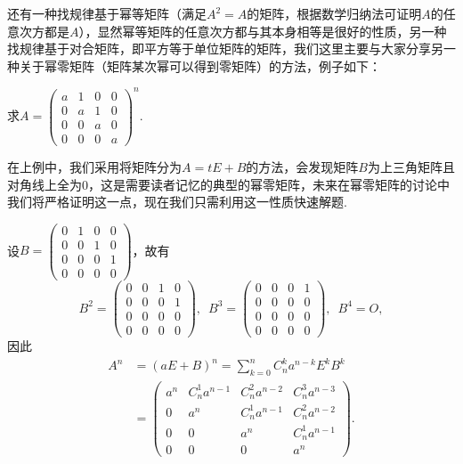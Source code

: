 \begin{enumerate}
          还有一种找规律基于幂等矩阵（满足$A^2=A$的矩阵，根据数学归纳法可证明$A$的任意次方都是$A$），显然幂等矩阵的任意次方都与其本身相等是很好的性质，另一种找规律基于对合矩阵，即平方等于单位矩阵的矩阵，我们这里主要与大家分享另一种关于幂零矩阵（矩阵某次幂可以得到零矩阵）的方法，例子如下：
          \begin{example}{}{}
              求$A=\begin{pmatrix}a & 1 & 0 & 0 \\ 0 & a & 1 & 0 \\ 0 & 0 & a & 0 \\ 0 & 0 & 0 & a \end{pmatrix}^n$.
          \end{example}
          在上例中，我们采用将矩阵分为$A=tE+B$的方法，会发现矩阵$B$为上三角矩阵且对角线上全为0，这是需要读者记忆的典型的幂零矩阵，未来在幂零矩阵的讨论中我们将严格证明这一点，现在我们只需利用这一性质快速解题.

          \begin{solution}
              设$B=\begin{pmatrix}
                      0 & 1 & 0 & 0 \\ 0 & 0 & 1 & 0 \\ 0 & 0 & 0 & 1 \\ 0 & 0 & 0 & 0
                  \end{pmatrix}$，故有
              \[B^2=\begin{pmatrix}
                      0 & 0 & 1 & 0 \\ 0 & 0 & 0 & 1 \\ 0 & 0 & 0 & 0 \\ 0 & 0 & 0 & 0
                  \end{pmatrix},\enspace B^3=\begin{pmatrix}
                      0 & 0 & 0 & 1 \\ 0 & 0 & 0 & 0 \\ 0 & 0 & 0 & 0 \\ 0 & 0 & 0 & 0
                  \end{pmatrix},\enspace B^4=O,\]
              因此
              \begin{align*}
                  A^n & =(aE+B)^n=\sum\limits_{k=0}^nC_n^ka^{n-k}E^kB^k   \\
                      & =\begin{pmatrix}
                             a^n & C_n^1a^{n-1} & C_n^2a^{n-2} & C_n^3a^{n-3} \\
                             0   & a^n          & C_n^1a^{n-1} & C_n^2a^{n-2} \\
                             0   & 0            & a^n          & C_n^1a^{n-1} \\
                             0   & 0            & 0            & a^n
                         \end{pmatrix}.
              \end{align*}
          \end{solution}


\end{enumerate}
